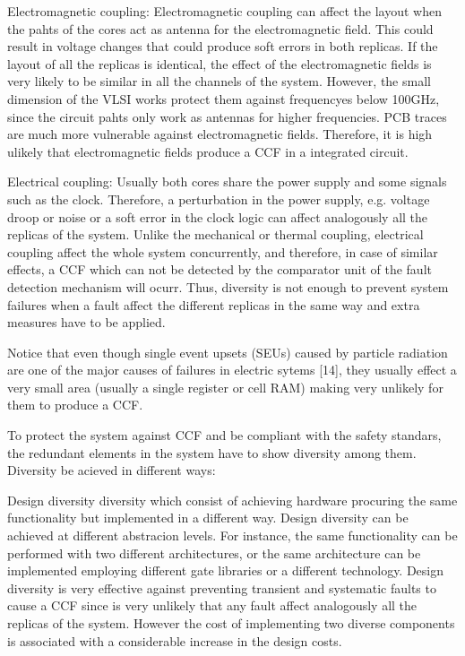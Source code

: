 Electromagnetic coupling: Electromagnetic coupling can affect the layout when the pahts of the cores act as antenna for the electromagnetic field. This could result in voltage changes that could produce soft errors in both replicas. If the layout of all the replicas is identical, the effect of the electromagnetic fields is very likely to be similar in all the channels of the system. However, the small dimension of the VLSI works protect them against frequencyes below 100GHz, since the circuit pahts only work as antennas for higher frequencies. PCB traces are much more vulnerable against electromagnetic fields. Therefore, it is high ulikely that electromagnetic fields produce a CCF in a integrated circuit.


Electrical coupling: Usually both cores share the power supply and some signals such as the clock. Therefore, a perturbation in the power supply, e.g. voltage droop or noise or a soft error in the clock logic can affect analogously all the replicas of the system. Unlike the mechanical or thermal coupling, electrical coupling affect the whole system concurrently, and therefore, in case of similar effects, a CCF which can not be detected by the comparator unit of the fault detection mechanism will ocurr. Thus, diversity is not enough to prevent system failures when a fault affect the different replicas in the same way and extra measures have to be applied. 

Notice that even though  single event upsets (SEUs) caused by particle radiation are one of the major causes of failures in electric sytems [14], they usually effect a very small area (usually a single register or cell RAM) making very unlikely for them to produce a CCF.   

To protect the system against CCF and be compliant with the safety standars, the redundant elements in the system have to show diversity among them. Diversity be acieved in different ways: 

Design diversity diversity which consist of achieving hardware procuring the same functionality but implemented in a different way. Design diversity can be achieved at different abstracion levels. For instance, the same functionality can be performed with two different architectures, or the same architecture can be implemented employing different gate libraries or a different technology. Design diversity is very effective against preventing transient and systematic faults to cause a CCF since is very unlikely that any fault affect analogously all the replicas of the system. However the cost of implementing two diverse components is associated with a considerable increase in the design costs.

